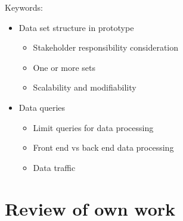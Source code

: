 Keywords:
\begin{itemize}
	\item Data set structure in prototype
	\begin{itemize}
		\item Stakeholder responsibility consideration
		\item One or more sets
		\item Scalability and modifiability
	\end{itemize}
	\item Data queries
	\begin{itemize}
		\item Limit queries for data processing
		\item Front end vs back end data processing
		\item Data traffic
	\end{itemize}
\end{itemize}

\section{Review of own work} %
\label{sec:review_of_own_work}
